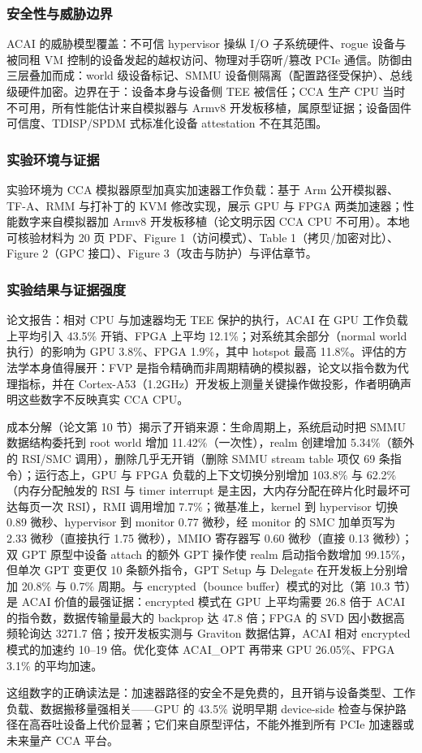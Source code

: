 \documentclass[11pt]{ctexart}
\begin{document}
\subsubsection{安全性与威胁边界}
ACAI 的威胁模型覆盖：不可信 hypervisor 操纵 I/O 子系统硬件、rogue 设备与被同租 VM 控制的设备发起的越权访问、物理对手窃听/篡改 PCIe 通信。防御由三层叠加而成：world 级设备标记、SMMU 设备侧隔离（配置路径受保护）、总线级硬件加密。边界在于：设备本身与设备侧 TEE 被信任；CCA 生产 CPU 当时不可用，所有性能估计来自模拟器与 Armv8 开发板移植，属原型证据；设备固件可信度、TDISP/SPDM 式标准化设备 attestation 不在其范围。\par
\subsubsection{实验环境与证据}
实验环境为 CCA 模拟器原型加真实加速器工作负载：基于 Arm 公开模拟器、TF-A、RMM 与打补丁的 KVM 修改实现，展示 GPU 与 FPGA 两类加速器；性能数字来自模拟器加 Armv8 开发板移植（论文明示因 CCA CPU 不可用）。本地可核验材料为 20 页 PDF、Figure 1（访问模式）、Table 1（拷贝/加密对比）、Figure 2（GPC 接口）、Figure 3（攻击与防护）与评估章节。\par
\subsubsection{实验结果与证据强度}
论文报告：相对 CPU 与加速器均无 TEE 保护的执行，ACAI 在 GPU 工作负载上平均引入 43.5\% 开销、FPGA 上平均 12.1\%；对系统其余部分（normal world 执行）的影响为 GPU 3.8\%、FPGA 1.9\%，其中 hotspot 最高 11.8\%。评估的方法学本身值得展开：FVP 是指令精确而非周期精确的模拟器，论文以指令数为代理指标，并在 Cortex-A53（1.2GHz）开发板上测量关键操作做投影，作者明确声明这些数字不反映真实 CCA CPU。\par
成本分解（论文第 10 节）揭示了开销来源：生命周期上，系统启动时把 SMMU 数据结构委托到 root world 增加 11.42\%（一次性），realm 创建增加 5.34\%（额外的 RSI/SMC 调用），删除几乎无开销（删除 SMMU stream table 项仅 69 条指令）；运行态上，GPU 与 FPGA 负载的上下文切换分别增加 103.8\% 与 62.2\%（内存分配触发的 RSI 与 timer interrupt 是主因，大内存分配在碎片化时最坏可达每页一次 RSI），RMI 调用增加 7.7\%；微基准上，kernel 到 hypervisor 切换 0.89 微秒、hypervisor 到 monitor 0.77 微秒，经 monitor 的 SMC 加单页写为 2.33 微秒（直接执行 1.75 微秒），MMIO 寄存器写 0.60 微秒（直接 0.13 微秒）；双 GPT 原型中设备 attach 的额外 GPT 操作使 realm 启动指令数增加 99.15\%，但单次 GPT 变更仅 10 条额外指令，GPT Setup 与 Delegate 在开发板上分别增加 20.8\% 与 0.7\% 周期。与 encrypted（bounce buffer）模式的对比（第 10.3 节）是 ACAI 价值的最强证据：encrypted 模式在 GPU 上平均需要 26.8 倍于 ACAI 的指令数，数据传输量最大的 backprop 达 47.8 倍；FPGA 的 SVD 因小数据高频轮询达 3271.7 倍；按开发板实测与 Graviton 数据估算，ACAI 相对 encrypted 模式的加速约 10--19 倍。优化变体 ACAI\_OPT 再带来 GPU 26.05\%、FPGA 3.1\% 的平均加速。\par
这组数字的正确读法是：加速器路径的安全不是免费的，且开销与设备类型、工作负载、数据搬移量强相关——GPU 的 43.5\% 说明早期 device-side 检查与保护路径在高吞吐设备上代价显著；它们来自原型评估，不能外推到所有 PCIe 加速器或未来量产 CCA 平台。\par
\end{document}
